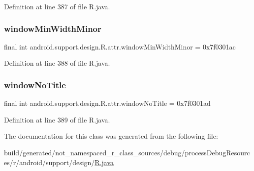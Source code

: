 Definition at line 387 of file R.\+java.

\mbox{\label{classandroid_1_1support_1_1design_1_1_r_1_1attr_a1690dd58d6b1695579d1cbdcb36fa7b4}} 
\subsubsection{\texorpdfstring{windowMinWidthMinor}{windowMinWidthMinor}}
{\footnotesize\ttfamily final int android.\+support.\+design.\+R.\+attr.\+window\+Min\+Width\+Minor = 0x7f0301ac\hspace{0.3cm}{\ttfamily [static]}}



Definition at line 388 of file R.\+java.

\mbox{\label{classandroid_1_1support_1_1design_1_1_r_1_1attr_ae7659b443bdf6ecfbb0bb28a213c6670}} 
\subsubsection{\texorpdfstring{windowNoTitle}{windowNoTitle}}
{\footnotesize\ttfamily final int android.\+support.\+design.\+R.\+attr.\+window\+No\+Title = 0x7f0301ad\hspace{0.3cm}{\ttfamily [static]}}



Definition at line 389 of file R.\+java.



The documentation for this class was generated from the following file\+:\begin{DoxyCompactItemize}
\item 
build/generated/not\+\_\+namespaced\+\_\+r\+\_\+class\+\_\+sources/debug/process\+Debug\+Resources/r/android/support/design/\mbox{\hyperlink{android_2support_2design_2_r_8java}{R.\+java}}\end{DoxyCompactItemize}
